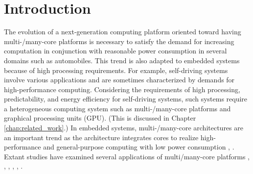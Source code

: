 



\chapter{Introduction}
\label{chap:introduction}
The evolution of a next-generation computing platform oriented toward having multi-/many-core platforms is necessary to satisfy the demand for increasing computation in conjunction with reasonable power consumption in several domains such as automobiles.
This trend is also adapted to embedded systems because of high processing requirements.
For example, self-driving systems involve various applications and are sometimes characterized by demands for high-performance computing.
Considering the requirements of high processing, predictability, and energy efficiency for self-driving systems, such systems require a heterogeneous computing system such as multi-/many-core platforms and graphical processing units (GPU).
(This is discussed in Chapter \ref{chap:related_work}.)
 In embedded systems, multi-/many-core architectures are an important trend as the architecture integrates cores to realize high-performance and general-purpose computing with low power consumption \cite{becker2016contention}, \cite{perret2016mapping}.
Extant studies have examined several applications of multi/many-core platforms \cite{becker2016contention}, \cite{saidi2015shift}, \cite{perret2016temporal}, \cite{perret2016mapping}, \cite{becker2014mapping}, \cite{BURGIO2017299}.

